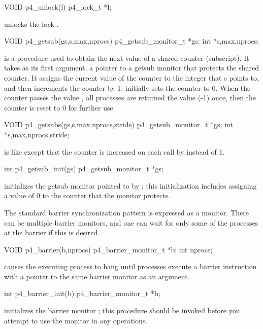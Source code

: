 \begin{example}
VOID p4_unlock(l)
p4_lock_t *l;
\end{example}
\noindent
unlocks the lock .

\begin{example}
VOID p4_getsub(gs,s,max,nprocs)
p4_getsub_monitor_t *gs;
int *s,max,nprocs;
\end{example}
\noindent
is a procedure used to obtain the next value of a shared counter
(subscript).  It takes as its first argument, a pointer to a getsub
monitor that protects the shared counter.  It assigns the current value
of the counter to the integer that s points to, and then increments the
counter by 1.   initially sets the counter to 0.
When the counter passes the value , all 
processes are returned the value (-1) once, then the counter is reset to
0 for further use.

\begin{example}
VOID p4_getsubs(gs,s,max,nprocs,stride)
p4_getsub_monitor_t *gs;
int *s,max,nprocs,stride;
\end{example}
\noindent
is like  except that the counter is increased on each call by
 instead of 1.


\begin{example}
int p4_getsub_init(gs)
p4_getsub_monitor_t *gs;
\end{example}
\noindent
initializes the getsub monitor pointed to by ; this initialization
includes assigning a value of 0 to the counter that the monitor
protects.


The standard barrier synchronization pattern is expressed as a monitor.
There can be multiple barrier monitors, and one can wait for only some
of the processes at the barrier if this is desired.

\begin{example}
VOID p4_barrier(b,nprocs)
p4_barrier_monitor_t *b;
int nprocs;
\end{example}
\noindent
causes the executing process to hang until  processes execute
a barrier instruction with a pointer to the same barrier monitor 
as an argument.

\begin{example}
int p4_barrier_init(b)
p4_barrier_monitor_t *b;
\end{example}
\noindent
initializes the barrier monitor ; this procedure should be invoked
before you attempt to use the monitor in any operations.

